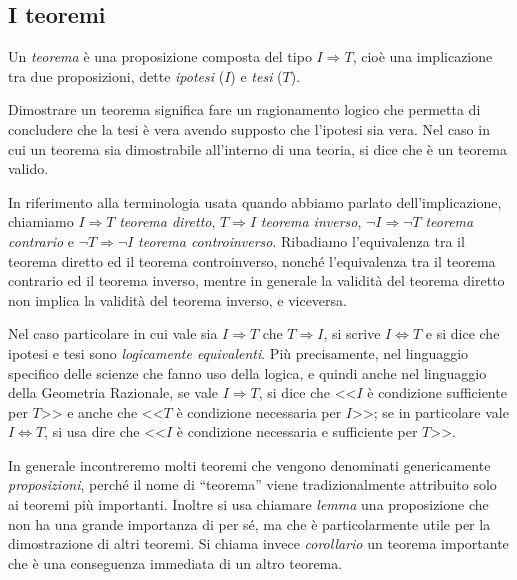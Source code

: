 \vspazio\ovalbox{\risolvii \ref{ese:1.15}, \ref{ese:1.16}, 
\ref{ese:1.17}}

\subsection{I teoremi}

Un \emph{teorema} è una proposizione composta del tipo  \(I\Rightarrow 
T\), cioè una implicazione tra due proposizioni, dette \emph{ipotesi} 
(\(I\)) e \emph{tesi} (\(T\)).

Dimostrare un teorema significa fare un ragionamento logico che 
permetta di concludere che la tesi è vera avendo supposto che 
l'ipotesi sia vera. Nel caso in cui un teorema sia dimostrabile 
all'interno di una teoria, si dice che è un teorema valido.

In riferimento alla terminologia usata quando abbiamo parlato 
dell'implicazione, chiamiamo  \(I\Rightarrow T\) \emph{teorema 
diretto}, \(T\Rightarrow I\) \emph{teorema inverso}, \(\neg I\Rightarrow 
\neg T\) \emph{teorema contrario} e \(\neg T\Rightarrow \neg I\) 
\emph{teorema controinverso}. Ribadiamo l'equivalenza tra il teorema 
diretto ed il teorema controinverso, nonché l'equivalenza tra il 
teorema contrario ed il teorema inverso, mentre in generale la 
validità del teorema diretto non implica la validità del teorema 
inverso, e viceversa.

Nel caso particolare in cui vale sia \(I\Rightarrow T\) che 
\(T\Rightarrow I\), si scrive  \(I\Leftrightarrow T\) e si dice che 
ipotesi e tesi sono \emph{logicamente equivalenti}. Più precisamente, 
nel linguaggio specifico delle scienze che fanno uso della logica, e 
quindi anche nel linguaggio della Geometria Razionale, se vale 
\(I\Rightarrow T\), si dice che <<\(I\) è condizione sufficiente per 
\(T\)>> e anche che <<\(T\) è condizione necessaria per \(I\)>>; se in 
particolare vale  \(I\Leftrightarrow T\), si usa dire che <<\(I\) è 
condizione necessaria e sufficiente per \(T\)>>.

In generale incontreremo molti teoremi che vengono denominati 
genericamente \emph{proposizioni}, perché il nome di ``teorema'' 
viene tradizionalmente attribuito solo ai teoremi più importanti. 
Inoltre si usa chiamare \emph{lemma} una proposizione che non ha una 
grande importanza di per sé, ma che è particolarmente utile per la 
dimostrazione di altri teoremi. Si chiama invece \emph{corollario} un 
teorema importante che è una conseguenza immediata di un altro 
teorema.

